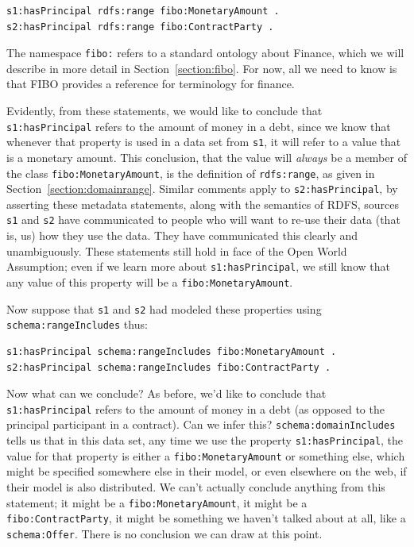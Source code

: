 \begin{lstlisting}
s1:hasPrincipal rdfs:range fibo:MonetaryAmount .
s2:hasPrincipal rdfs:range fibo:ContractParty .
\end{lstlisting}

The namespace \texttt{fibo:} refers to a standard ontology about Finance, which we will describe in more detail
in Section~\ref{section:fibo}. For now, all we need to know is that FIBO provides a reference for terminology
for finance.   

Evidently, from these statements, we would like to conclude that \texttt{s1:hasPrincipal} refers to the amount of money 
in a debt, since we know that whenever that property is used in a data set from \texttt{s1}, it will refer to a value that 
is a monetary amount.  This conclusion, that the value will \emph{always} be a member of the class \texttt{fibo:MonetaryAmount}, 
is the definition of \texttt{rdfs:range}, as given in Section~\ref{section:domainrange}.  Similar comments apply
to \texttt{s2:hasPrincipal}, by asserting these metadata statements, along with the semantics of RDFS, sources \texttt{s1}
and \texttt{s2} have communicated to people who will want to re-use their data (that is, us) how they use the 
data.  They have communicated this clearly and unambiguously.  These statements still hold in face of the Open World Assumption;
even if we learn more about \texttt{s1:hasPrincipal}, we still know that any value of this property will be a \texttt{fibo:MonetaryAmount}. 

Now suppose that \texttt{s1} and \texttt{s2} had modeled these properties using  \texttt{schema:rangeIncludes} thus:

\begin{lstlisting}
s1:hasPrincipal schema:rangeIncludes fibo:MonetaryAmount .
s2:hasPrincipal schema:rangeIncludes fibo:ContractParty .
\end{lstlisting}

Now what can we conclude?  As before, we'd like to conclude that \texttt{s1:hasPrincipal} refers to the amount of money 
in a debt (as opposed to the principal participant in a contract).  Can we infer this?  \texttt{schema:domainIncludes} tells 
us that in this data set, any time we use the property \texttt{s1:hasPrincipal}, the value for that property is either
a \texttt{fibo:MonetaryAmount} or something else, which might be specified somewhere else in their model, 
or even elsewhere on the web, if their model is also distributed.  We can't actually
conclude anything from this statement; it might be a \texttt{fibo:MonetaryAmount}, it might be a \texttt{fibo:ContractParty}, it 
might be something we haven't talked about at all, like a \texttt{schema:Offer}.  There is no conclusion we can draw at this
point. 

